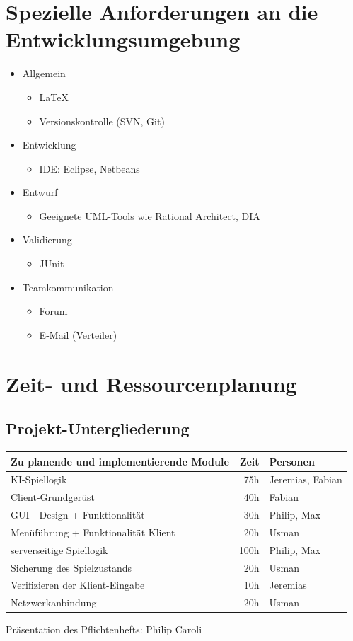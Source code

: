 \documentclass[a4paper,10pt]{article}
\begin{document}
\section{Spezielle Anforderungen an die Entwicklungsumgebung}
\begin{itemize}
\item Allgemein
\begin{itemize}
\item \LaTeX
\item Versionskontrolle (SVN, Git)
\end{itemize}
\item Entwicklung
\begin{itemize}
\item IDE: Eclipse, Netbeans
\end{itemize}
\item  Entwurf
\begin{itemize}
\item Geeignete UML-Tools wie Rational Architect, DIA
\end{itemize}
\item Validierung
\begin{itemize}
\item JUnit
\end{itemize}
\item Teamkommunikation
\begin{itemize}
\item Forum
\item E-Mail (Verteiler)
\end{itemize}
\end{itemize}

\section{Zeit- und Ressourcenplanung}
\subsection{Projekt-Untergliederung}
\begin{tabular}[h]{l | r | l}
  \hline
  Zu planende und implementierende Module & Zeit & Personen\\
  \hline
  \hline
  KI-Spiellogik & 75h & Jeremias, Fabian \\
  Client-Grundgerüst & 40h & Fabian\\
  GUI - Design + Funktionalität & 30h & Philip, Max\\
  Menüführung + Funktionalität Klient & 20h & Usman\\
  serverseitige Spiellogik & 100h & Philip, Max\\
  Sicherung des Spielzustands & 20h & Usman\\
  Verifizieren der Klient-Eingabe & 10h & Jeremias\\
  Netzwerkanbindung & 20h & Usman\\
  \hline
\end{tabular}
Präsentation des Pflichtenhefts: Philip Caroli
\end{document}
